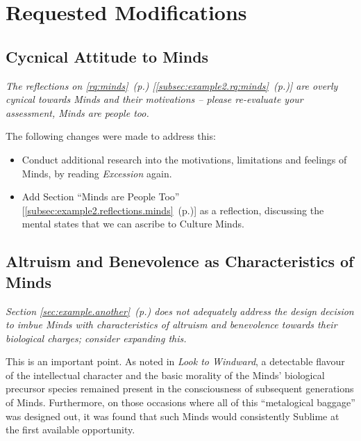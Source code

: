 \documentclass[hidelinks,a4paper,11pt,openany]{article}
\begin{document}

\renewcommand{\thesisref}[1]{\ref*{#1}~(p.\pageref*{#1})}


\section{Requested Modifications}
\label{sec:requested-mods}

\subsection{Cycnical Attitude to Minds}
\label{subsec:requested-mods.cynicism}

\textit{The reflections on \thesisref{rq:minds} [\thesisref{subsec:example2.rq:minds}] are overly cynical towards Minds and their motivations -- please re-evaluate your assessment, Minds are people too.}

The following changes were made to address this:

\begin{itemize}[topsep=0pt, itemsep=8pt]
	\item Conduct additional research into the motivations, limitations and feelings of Minds, by reading \textit{Excession} again.
	\item Add Section ``Minds are People Too'' [\thesisref{subsec:example2.reflections.minds}] as a reflection, discussing the mental states that we can ascribe to Culture Minds.
\end{itemize}


\subsection{Altruism and Benevolence as Characteristics of Minds}
\label{subsec:requested-mods.altruism}

\textit{Section \thesisref{sec:example.another} does not adequately address the design decision to imbue Minds with characteristics of	
	altruism and benevolence towards their biological charges; consider expanding this.}

This is an important point.  As noted in \textit{Look to Windward}, a detectable flavour of the intellectual character and the basic morality of the Minds' biological precursor species remained present in the consciousness of subsequent generations of Minds.  Furthermore, on those occasions where all of this ``metalogical baggage'' was designed out, it was found that such Minds would consistently Sublime at the first available opportunity.
\end{document}
